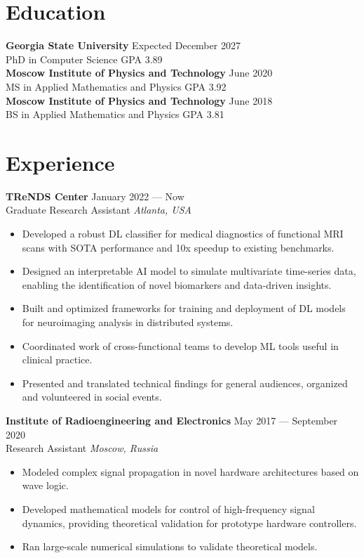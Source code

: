 \documentclass[11pt,a4paper]{article}
\begin{document}
\section*{Education}
\noindent\textbf{Georgia State University} \hfill Expected December 2027\\
PhD in Computer Science \hfill
GPA 3.89\\[0.3em]
\textbf{Moscow Institute of Physics and Technology} \hfill June 2020\\
MS in Applied Mathematics and Physics \hfill 
GPA 3.92\\[0.3em]
\textbf{Moscow Institute of Physics and Technology} \hfill June 2018\\
BS in Applied Mathematics and Physics \hfill 
GPA 3.81

\section*{Experience}
\noindent\textbf{TReNDS Center} \hfill January 2022 --- Now\\
Graduate Research Assistant \hfill \textit{Atlanta, USA}\\
[-2em]
\begin{itemize}[leftmargin=*,noitemsep]
    \item Developed a robust DL classifier for medical diagnostics of functional MRI scans with SOTA performance and 10x speedup to existing benchmarks.
    \item Designed an interpretable AI model to simulate multivariate time-series data, enabling the identification of novel biomarkers and data-driven insights.
    \item Built and optimized frameworks for training and deployment of DL models for neuroimaging analysis in distributed systems.
    \item Coordinated work of cross-functional teams to develop ML tools useful in clinical practice.
    \item Presented and translated technical findings for general audiences, organized and volunteered in social events.
\end{itemize}

\noindent\textbf{Institute of Radioengineering and Electronics} \hfill May 2017 --- September 2020\\
Research Assistant \hfill \textit{Moscow, Russia}\\
[-2em]
\begin{itemize}[leftmargin=*,noitemsep]
    \item Modeled complex signal propagation in novel hardware architectures based on wave logic.
    \item Developed mathematical models for control of high-frequency signal dynamics, providing theoretical validation for prototype hardware controllers.
    \item Ran large-scale numerical simulations to validate theoretical models.
\end{itemize}
\end{document}
